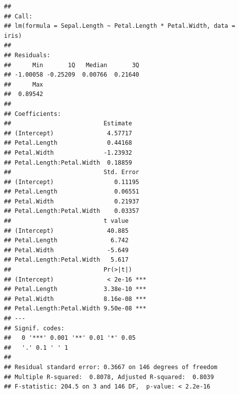 \documentclass[
]{book}
\newenvironment{Shaded}{\begin{snugshade}}{\end{snugshade}}
\newcommand{\CommentTok}[1]{\textcolor[rgb]{0.56,0.35,0.01}{\textit{#1}}}
\newcommand{\DataTypeTok}[1]{\textcolor[rgb]{0.13,0.29,0.53}{#1}}
\newcommand{\DecValTok}[1]{\textcolor[rgb]{0.00,0.00,0.81}{#1}}
\newcommand{\FloatTok}[1]{\textcolor[rgb]{0.00,0.00,0.81}{#1}}
\newcommand{\KeywordTok}[1]{\textcolor[rgb]{0.13,0.29,0.53}{\textbf{#1}}}
\newcommand{\NormalTok}[1]{#1}
\newcommand{\OperatorTok}[1]{\textcolor[rgb]{0.81,0.36,0.00}{\textbf{#1}}}
\newcommand{\StringTok}[1]{\textcolor[rgb]{0.31,0.60,0.02}{#1}}
\begin{document}
\begin{verbatim}
## 
## Call:
## lm(formula = Sepal.Length ~ Petal.Length * Petal.Width, data = iris)
## 
## Residuals:
##      Min       1Q   Median       3Q 
## -1.00058 -0.25209  0.00766  0.21640 
##      Max 
##  0.89542 
## 
## Coefficients:
##                          Estimate
## (Intercept)               4.57717
## Petal.Length              0.44168
## Petal.Width              -1.23932
## Petal.Length:Petal.Width  0.18859
##                          Std. Error
## (Intercept)                 0.11195
## Petal.Length                0.06551
## Petal.Width                 0.21937
## Petal.Length:Petal.Width    0.03357
##                          t value
## (Intercept)               40.885
## Petal.Length               6.742
## Petal.Width               -5.649
## Petal.Length:Petal.Width   5.617
##                          Pr(>|t|)    
## (Intercept)               < 2e-16 ***
## Petal.Length             3.38e-10 ***
## Petal.Width              8.16e-08 ***
## Petal.Length:Petal.Width 9.50e-08 ***
## ---
## Signif. codes:  
##   0 '***' 0.001 '**' 0.01 '*' 0.05
##   '.' 0.1 ' ' 1
## 
## Residual standard error: 0.3667 on 146 degrees of freedom
## Multiple R-squared:  0.8078, Adjusted R-squared:  0.8039 
## F-statistic: 204.5 on 3 and 146 DF,  p-value: < 2.2e-16
\end{verbatim}

\begin{Shaded}
\end{Shaded}
\end{document}
